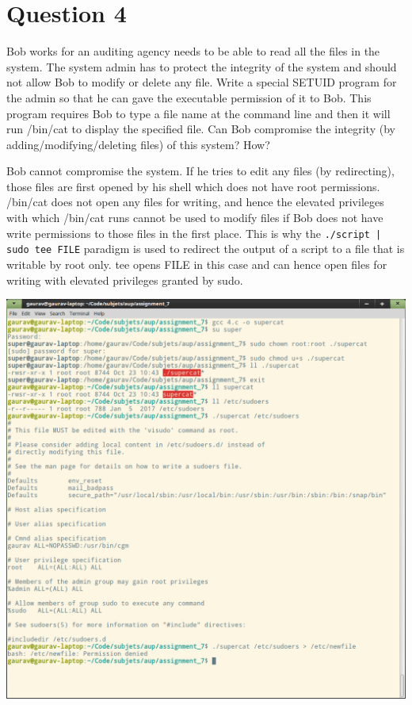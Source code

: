 \documentclass[main.tex]{subfiles}
\begin{document}
\section{Question 4}
Bob works for an auditing agency needs to be able to read all the files in the
system. The system admin has to protect the integrity of the system and should
not allow Bob to modify or delete any file. Write a special SETUID program for
the admin so that he can gave the executable permission of it to Bob. This
program requires Bob to type a file name at the command line and then it will
run /bin/cat to display the specified file. Can Bob compromise the integrity (by
adding/modifying/deleting files) of this system? How?



Bob cannot compromise the system. If he tries to edit any files (by
redirecting), those files are first opened by his shell which does not have root
permissions. /bin/cat does not open any files for writing, and hence the
elevated privileges with which /bin/cat runs cannot be used to modify files if
Bob does not have write permissions to those files in the first place.  This is
why the \texttt{./script | sudo tee FILE} paradigm is used to redirect the
output of a script to a file that is writable by root only. tee opens FILE in
this case and can hence open files for writing with elevated privileges granted
by sudo.

\includegraphics[width=\textwidth]{figures/4_output.png}
\end{document}
